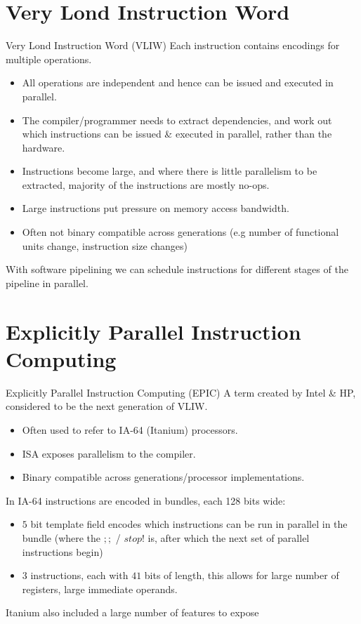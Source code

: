 \section{Very Lond Instruction Word}
\begin{definitionbox}{Very Lond Instruction Word (VLIW)}
    Each instruction contains encodings for multiple operations.
    \begin{itemize}
        \item All operations are independent and hence can be issued and executed in parallel.
        \item The compiler/programmer needs to extract dependencies, and work out which instructions can be issued \& executed in parallel, rather than the hardware.
        \item Instructions become large, and where there is little parallelism to be extracted, majority of the instructions are mostly no-ops.
        \item Large instructions put pressure on memory access bandwidth.
        \item Often not binary compatible across generations (e.g number of functional units change, instruction size changes)
    \end{itemize}
\end{definitionbox}
With software pipelining we can schedule instructions for different stages of the pipeline in parallel.

\section{Explicitly Parallel Instruction Computing}
\begin{definitionbox}{Explicitly Parallel Instruction Computing (EPIC)}
    A term created by Intel \& HP, considered to be the next generation of VLIW. 
    \begin{itemize}
        \item Often used to refer to IA-64 (Itanium) processors.
        \item ISA exposes parallelism to the compiler.
        \item Binary compatible across generations/processor implementations.
    \end{itemize}
\end{definitionbox}

In IA-64 instructions are encoded in bundles, each 128 bits wide:
\begin{itemize}
    \item $5$ bit template field encodes which instructions can be run in parallel in the bundle (where the $;;$ / $stop!$ is, after which the next set of parallel instructions begin)
    \item $3$ instructions, each with $41$ bits of length, this allows for large number of registers, large immediate operands.
\end{itemize}
Itanium also included a large number of features to expose 